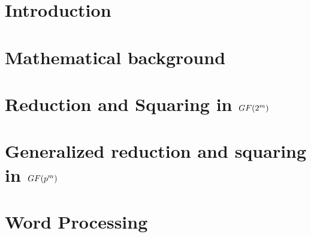 \documentclass{ufscThesis}
\begin{document}
\capa  
\folhaderosto %
\folhaaprovacao
\paginaresumo
\paginaabstract
\listadefiguras
\listadetabelas 
\listadeabreviaturas
\listadesimbolos
\sumario

%
%
%
%
%
\chapter{Introduction}


\chapter{Mathematical background}\label{cap:background}


\chapter{Reduction and Squaring in $GF(2^\MakeLowercase{m})$}


\chapter{Generalized reduction and squaring in $GF(\MakeLowercase{p}^\MakeLowercase{m})$} \label{pth}


\chapter{Word Processing}

\end{document}
